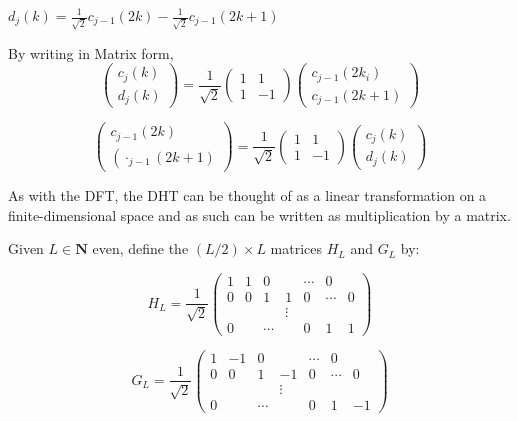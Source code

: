 $d_{j}(k)=\frac{1}{\sqrt{2}} c_{j-1}(2 k)-\frac{1}{\sqrt{2}} c_{j-1}(2 k+1)$

By writing in Matrix form,
$$
\left(\begin{array}{c}{c_{j}(k)} \\ {d_{j}(k)}\end{array}\right)=\frac{1}{\sqrt{2}}\left(\begin{array}{cc}{1} & {1} \\ {1} & {-1}\end{array}\right)\left(\begin{array}{c}{c_{j-1}\left(2 k_{i}\right)} \\ {c_{j-1}(2 k+1)}\end{array}\right)
$$

$$
\left(\begin{array}{c}{c_{j-1}(2 k)} \\ {\left(\cdot_{j-1}(2 k+1)\right.}\end{array}\right)=\frac{1}{\sqrt{2}}\left(\begin{array}{cc}{1} & {1} \\ {1} & {-1}\end{array}\right)\left(\begin{array}{c}{c_{j}(k)} \\ {d_{j}(k)}\end{array}\right)
$$

As with the DFT, the DHT can be thought of as a linear transformation on a finite-dimensional space and as such can be written as multiplication by a matrix.

Given $L \in \mathbf{N}$ even, define the $(L / 2) \times L$ matrices $H_{L}$ and $G_{L}$ by:

$$
H_{L}=\frac{1}{\sqrt{2}}\left(\begin{array}{cccccc}{1} & {1} & {0} & {} & {\cdots} & {0} \\ {0} & {0} & {1} & {1} & {0} & {\cdots} & {0} \\ {} & {} & {} & {\vdots} & {} \\ {0} & {} & {\cdots} & {} & {0} & {1} & {1}\end{array}\right)
$$

$$
G_{L}=\frac{1}{\sqrt{2}}\left(\begin{array}{cccccc}{1} & {-1} & {0} & {} & {\cdots} & {0} \\ {0} & {0} & {1} & {-1} & {0} & {\cdots} & {0} \\ {} & {} & {} & {\vdots} \\ {0} & {} & {\cdots} & {} & {0} & {1} & {-1}\end{array}\right)
$$

